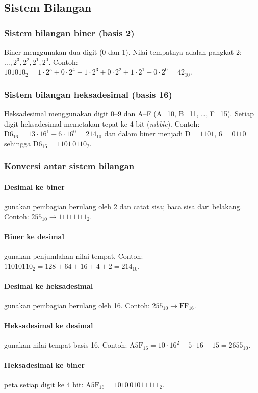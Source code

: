 \subsection{Sistem Bilangan}
\subsubsection{Sistem bilangan biner (basis 2)}
Biner menggunakan dua digit (0 dan 1). Nilai tempatnya adalah pangkat 2: \(\ldots, 2^3, 2^2, 2^1, 2^0\). Contoh: \(101010_2 = 1\cdot 2^5 + 0\cdot 2^4 + 1\cdot 2^3 + 0\cdot 2^2 + 1\cdot 2^1 + 0\cdot 2^0 = 42_{10}\).

\subsubsection{Sistem bilangan heksadesimal (basis 16)}
Heksadesimal menggunakan digit 0--9 dan A--F (A=10, B=11, \ldots, F=15). Setiap digit heksadesimal memetakan tepat ke 4 bit (\textit{nibble}). Contoh: \(\mathrm{D6}_{16} = 13\cdot 16^1 + 6\cdot 16^0 = 214_{10}\) dan dalam biner menjadi \(\mathrm{D} = 1101\), \(6 = 0110\) sehingga \(\mathrm{D6}_{16} = 1101\,0110_2\).

\subsubsection{Konversi antar sistem bilangan}
\paragraph{Desimal ke biner} gunakan pembagian berulang oleh 2 dan catat sisa; baca sisa dari belakang. Contoh: \(255_{10} \to 11111111_2\).
\paragraph{Biner ke desimal} gunakan penjumlahan nilai tempat. Contoh: \(11010110_2 = 128+64+16+4+2 = 214_{10}\).
\paragraph{Desimal ke heksadesimal} gunakan pembagian berulang oleh 16. Contoh: \(255_{10} \to \mathrm{FF}_{16}\).
\paragraph{Heksadesimal ke desimal} gunakan nilai tempat basis 16. Contoh: \(\mathrm{A5F}_{16} = 10\cdot 16^2 + 5\cdot 16 + 15 = 2655_{10}\).
\paragraph{Heksadesimal ke biner} peta setiap digit ke 4 bit: \(\mathrm{A5F}_{16} = 1010\,0101\,1111_2\).

